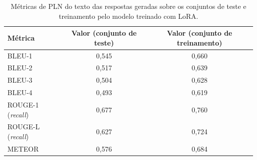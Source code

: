 \begin{table}[ht]
    \caption{\small Métricas de \ac{PLN} do texto das respostas geradas sobre os conjuntos de teste e treinamento pelo
    modelo treinado com \ac{LoRA}.}
    \centering
    \begin{tabular}{l|c|c}
        \hline
        Métrica                        & Valor (conjunto de teste) & Valor (conjunto de treinamento) \\ \hline
        \ac{BLEU}-1                    & 0,545                     & 0,660                           \\
        \ac{BLEU}-2                    & 0,517                     & 0,639                           \\
        \ac{BLEU}-3                    & 0,504                     & 0,628                           \\
        \ac{BLEU}-4                    & 0,493                     & 0,619                           \\
        \hline
        \ac{ROUGE}-1 (\textit{recall}) & 0,677                     & 0,760                           \\
        \ac{ROUGE}-L (\textit{recall}) & 0,627                     & 0,724                           \\
        \hline
        \ac{METEOR}                    & 0,576                     & 0,684                           \\
        \hline
    \end{tabular}
    \label{tab:lladerm_lora_nlp_metrics}
\end{table}
